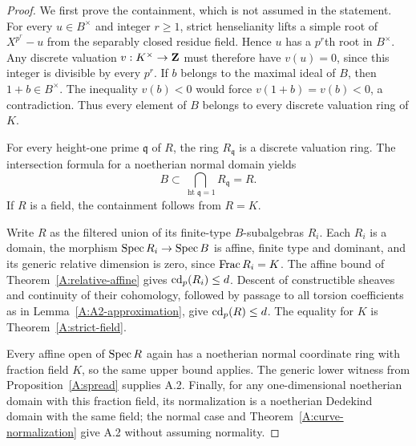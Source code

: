 \begin{proof}
We first prove the containment, which is not assumed in the
statement. For every $u\in B^\times$ and integer $r\geq1$,
strict henselianity lifts a simple root of $X^{p^r}-u$ from the
separably closed residue field. Hence $u$ has a $p^r$th root in
$B^\times$. Any discrete valuation $v:K^\times\to\mathbf Z$ must
therefore have $v(u)=0$, since this integer is divisible by
every $p^r$. If $b$ belongs to the maximal ideal of $B$, then
$1+b\in B^\times$. The inequality $v(b)<0$ would force
$v(1+b)=v(b)<0$, a contradiction. Thus every element of $B$
belongs to every discrete valuation ring of $K$.

For every height-one prime $\mathfrak q$ of $R$, the ring
$R_{\mathfrak q}$ is a discrete valuation ring. The intersection
formula for a noetherian normal domain
\citep[Tag 031T, Lemma 10.157.6(2)]{A_Stacks} yields
\[
 B\subset\bigcap_{\operatorname{ht}\mathfrak q=1}
 R_{\mathfrak q}=R.
\]
If $R$ is a field, the containment follows from $R=K$.

Write $R$ as the filtered union of its finite-type $B$-subalgebras
$R_i$. Each $R_i$ is a domain, the morphism
$\operatorname{Spec} R_i\to\operatorname{Spec} B$ is affine, finite type and dominant,
and its generic relative dimension is zero, since
$\operatorname{Frac} R_i=K$. The affine bound of
Theorem~\ref{A:relative-affine} gives $\operatorname{cd}_p(R_i)\leq d$.
Descent of constructible sheaves and continuity of their
cohomology, followed by passage to all torsion coefficients as
in Lemma~\ref{A:A2-approximation}, give $\operatorname{cd}_p(R)\leq d$.
The equality for $K$ is Theorem~\ref{A:strict-field}.

Every affine open of $\operatorname{Spec} R$ again has a noetherian normal
coordinate ring with fraction field $K$, so the same upper bound
applies. The generic lower witness from
Proposition~\ref{A:spread} supplies A.2. Finally, for any
one-dimensional noetherian domain with this fraction field,
its normalization is a noetherian Dedekind domain with the same
field; the normal case and Theorem~\ref{A:curve-normalization}
give A.2 without assuming normality.
\end{proof}
